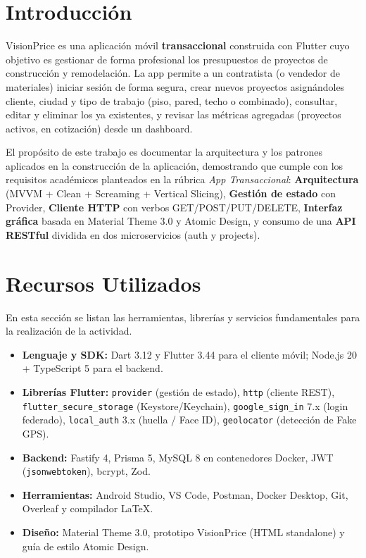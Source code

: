 \documentclass[12pt, a4paper]{article} %
\begin{document}

\section{Introducción}
\label{sec:introduccion}
VisionPrice es una aplicación móvil \textbf{transaccional} construida con
Flutter cuyo objetivo es gestionar de forma profesional los presupuestos
de proyectos de construcción y remodelación. La app permite a un
contratista (o vendedor de materiales) iniciar sesión de forma segura,
crear nuevos proyectos asignándoles cliente, ciudad y tipo de trabajo
(piso, pared, techo o combinado), consultar, editar y eliminar los ya
existentes, y revisar las métricas agregadas (proyectos activos, en
cotización) desde un dashboard.

El propósito de este trabajo es documentar la arquitectura y los
patrones aplicados en la construcción de la aplicación, demostrando que
cumple con los requisitos académicos planteados en la rúbrica
\textit{App Transaccional}: \textbf{Arquitectura} (MVVM + Clean +
Screaming + Vertical Slicing), \textbf{Gestión de estado} con Provider,
\textbf{Cliente HTTP} con verbos GET/POST/PUT/DELETE, \textbf{Interfaz
gráfica} basada en Material Theme 3.0 y Atomic Design, y consumo de una
\textbf{API RESTful} dividida en dos microservicios (auth y projects).

\section{Recursos Utilizados}
\label{sec:recursos}
En esta sección se listan las herramientas, librerías y servicios
fundamentales para la realización de la actividad.

\begin{itemize}
    \item \textbf{Lenguaje y SDK:} Dart 3.12 y Flutter 3.44 para el
    cliente móvil; Node.js 20 + TypeScript 5 para el backend.
    \item \textbf{Librerías Flutter:} \texttt{provider} (gestión de
    estado), \texttt{http} (cliente REST),
    \texttt{flutter\_secure\_storage} (Keystore/Keychain),
    \texttt{google\_sign\_in} 7.x (login federado),
    \texttt{local\_auth} 3.x (huella / Face ID),
    \texttt{geolocator} (detección de Fake GPS).
    \item \textbf{Backend:} Fastify 4, Prisma 5, MySQL 8 en
    contenedores Docker, JWT (\texttt{jsonwebtoken}), bcrypt, Zod.
    \item \textbf{Herramientas:} Android Studio, VS Code, Postman,
    Docker Desktop, Git, Overleaf y compilador \LaTeX{}.
    \item \textbf{Diseño:} Material Theme 3.0, prototipo VisionPrice
    (HTML standalone) y guía de estilo Atomic Design.
\end{itemize}
\end{document}

